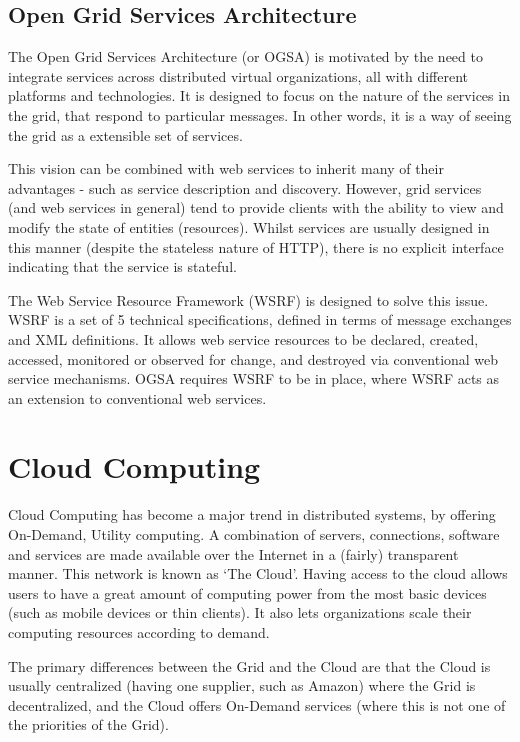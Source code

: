 \documentclass{article}
\begin{document}
\subsection{Open Grid Services Architecture}
The Open Grid Services Architecture (or OGSA) is motivated by the need to integrate services across distributed virtual organizations, all with different platforms and technologies. It is designed to focus on the nature of the services in the grid, that respond to particular messages. In other words, it is a way of seeing the grid as a extensible set of services.

This vision can be combined with web services to inherit many of their advantages - such as service description and discovery. However, grid services (and web services in general) tend to provide clients with the ability to view and modify the state of entities (resources). Whilst services are usually designed in this manner (despite the stateless nature of HTTP), there is no explicit interface indicating that the service is stateful.

The Web Service Resource Framework (WSRF) is designed to solve this issue. WSRF is a set of 5 technical specifications, defined in terms of message exchanges and XML definitions. It allows web service resources to be declared, created, accessed, monitored or observed for change, and destroyed via conventional web service mechanisms. OGSA requires WSRF to be in place, where WSRF acts as an extension to conventional web services.

\section{Cloud Computing}
Cloud Computing has become a major trend in distributed systems, by offering On-Demand, Utility computing. A combination of servers, connections, software and services are made available over the Internet in a (fairly) transparent manner. This network is known as `The Cloud'. Having access to the cloud allows users to have a great amount of computing power from the most basic devices (such as mobile devices or thin clients). It also lets organizations scale their computing resources according to demand.

The primary differences between the Grid and the Cloud are that the Cloud is usually centralized (having one supplier, such as Amazon) where the Grid is decentralized, and the Cloud offers On-Demand services (where this is not one of the priorities of the Grid).
\end{document}
